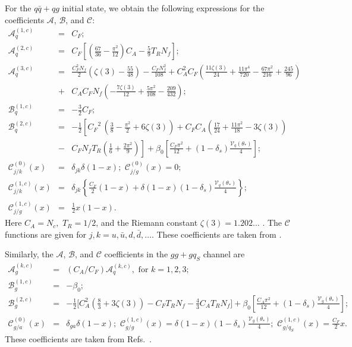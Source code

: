 \documentclass[12pt,english,aps,preprint,prd,letterpaper,fleqn,nofootinbib,showpacs,showkeys,tightenlines,floatfix]{revtex4}
\begin{document}
{For the $q\bar{q}+qg$ initial state, we obtain the following expressions
for the coefficients $\mathcal{A}$, $\mathcal{B}$, and ${\mathcal{C}}$:
\begin{eqnarray}
\mathcal{A}_{q}^{(1,c)} & = & C_{F};\nonumber \\
\mathcal{A}_{q}^{(2,c)} & = & C_{F}\left[\left(\frac{67}{36}-\frac{\pi^{2}}{12}\right)C_{A}-\frac{5}{9}T_{R}N_{f}\right];\\
\mathcal{A}_{q}^{(3,c)} & = & \frac{C_{F}^{2}N_{f}}{2}\left(\zeta(3)-\frac{55}{48}\right)-\frac{C_{F}N_{f}^{2}}{108}+C_{A}^{2}C_{F}\left(\frac{11\zeta(3)}{24}+\frac{11\pi^{4}}{720}-\frac{67\pi^{2}}{216}+\frac{245}{96}\right)\nonumber \\
 & + & C_{A}C_{F}N_{f}\left(-\frac{7\zeta(3)}{12}+\frac{5\pi^{2}}{108}-\frac{209}{432}\right);\nonumber \\
\mathcal{B}_{q}^{(1,c)} & = & -\frac{3}{2}C_{F};\nonumber \\
\mathcal{B}_{q}^{(2,c)} & = & -\frac{1}{2}\left[{C_{F}}^{2}\,\left(\frac{3}{8}-\frac{\pi^{2}}{2}+6\zeta(3)\right)\right.+C_{F}C_{A}\left(\frac{17}{24}+\frac{11\pi^{2}}{18}-3\zeta(3)\right)\nonumber \\
 & - & \left.C_{F}N_{f}T_{R}\left(\frac{1}{6}+\frac{2\pi^{2}}{9}\right)\right]+\beta_{0}\left[\frac{C_{F}\pi^{2}}{12}+(1-\delta_{s})\frac{\mathcal{V}_{q}(\theta_{*})}{4}\right];\nonumber \\
\mathcal{C}_{j/k}^{(0)}(x) & = & \delta_{jk}\delta(1-x);\,\,\mathcal{C}_{j/g}^{(0)}(x)=0;\nonumber \\
\mathcal{C}_{j/k}^{(1,c)}(x) & = & \delta_{jk}\left\{ \frac{C_{F}}{2}(1-x)+\delta(1-x)(1-\delta_{s})\frac{\mathcal{V}_{q}(\theta_{*})}{4}\right\} ;\nonumber \\
\mathcal{C}_{j/g}^{(1,c)}(x) & = & {\frac{1}{2}}x(1-x).\end{eqnarray}
 Here $C_{A}=N_{c},$ $T_{R}=1/2$, and the Riemann constant $\zeta(3)=1.202\dots$
. The ${\mathcal{C}}$ functions are given for $j,k=u,\bar{u},d,\bar{d},\dots$.
These coefficients are taken from \cite{Balazs:1997hv,deFlorian:2000pr,Moch:2004pa}.

Similarly, the ${\mathcal{A}}$, ${\mathcal{B}}$, and
${\mathcal{C}}$ coefficients in the $gg+gq_{S}$ channel are \begin{eqnarray}
\mathcal{A}_{g}^{(k,c)} & = & (C_{A}/C_{F})\mathcal{A}_{q}^{(k,c)},\mbox{ for }k=1,2,3;\nonumber \\
\mathcal{B}_{g}^{(1,c)} & = & -\beta_{0};\nonumber \\
\mathcal{B}_{g}^{(2,c)} & = & -\frac{1}{2}\Biggl[C_{A}^{2}\left(\frac{8}{3}+3\zeta(3)\right)-C_{F}T_{R}N_{f}-\frac{4}{3}C_{A}T_{R}N_{f}\Biggr]+\beta_{0}\left[\frac{C_{A}\pi^{2}}{12}+(1-\delta_{s})\frac{\mathcal{V}_{g}(\theta_{*})}{4}\right];\nonumber \\
\mathcal{C}_{g/a}^{(0)}\left(x\right) & = & \delta_{ga}\delta(1-x);\,\,\mathcal{C}_{g/g}^{(1,c)}\left(x\right)=\delta(1-x)(1-\delta_{s})\frac{\mathcal{V}_{g}(\theta_{*})}{4};\,\,\mathcal{C}_{g/q_{S}}^{(1,c)}\left(x\right)=\frac{C_{F}}{2}x.\end{eqnarray}
 These coefficients are taken from Refs.~\cite{Balazs:1997hv,Nadolsky:2002gj,Yuan:1991we,Vogt:2004mw}.


}
\end{document}
